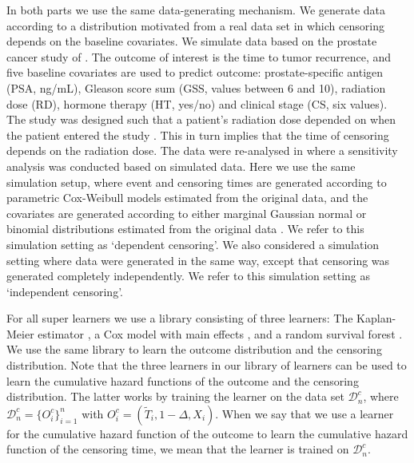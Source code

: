 \documentclass[a4paper,danish]{article}
\theoremstyle{plain} %
\numberwithin{theorem}{section}
\theoremstyle{definition} %
\theoremstyle{remark}
\newcommand{\1}{\mathds{1}}
\newcommand{\data}{\ensuremath{\mathcal{D}}}
\begin{document}
In both parts we use the same data-generating mechanism. We generate data
according to a distribution motivated from a real data set in which censoring
depends on the baseline covariates. We simulate data based on the prostate
cancer study of \cite{kattan2000pretreatment}. The outcome of interest is the
time to tumor recurrence, and five baseline covariates are used to predict
outcome: prostate-specific antigen (PSA, ng/mL), Gleason score sum (GSS, values
between 6 and 10), radiation dose (RD), hormone therapy (HT, yes/no) and
clinical stage (CS, six values). The study was designed such that a patient's
radiation dose depended on when the patient entered the study
\citep{gerds2013estimating}. This in turn implies that the time of censoring
depends on the radiation dose. The data were re-analysed in
\citep{gerds2013estimating} where a sensitivity analysis was conducted based on
simulated data. Here we use the same simulation setup, where event and censoring
times are generated according to parametric Cox-Weibull models estimated from
the original data, and the covariates are generated according to either marginal
Gaussian normal or binomial distributions estimated from the original data
\citep[c.f.,][Section~4.6]{gerds2013estimating}. We refer to this simulation
setting as `dependent censoring'. We also considered a simulation setting where
data were generated in the same way, except that censoring was generated
completely independently. We refer to this simulation setting as `independent
censoring'.

For all super learners we use a library consisting of three learners:
The Kaplan-Meier estimator
\citep{kaplan1958nonparametric,Gerds_2019prodlim}, a Cox model with
main effects \citep{cox1972regression, survival-package}, and a random
survival forest \citep{ishwaran2008random,rfsrc-paclage}. We use the
same library to learn the outcome distribution and the censoring
distribution. Note that the three learners in our library of learners
can be used to learn the cumulative hazard functions of the 
outcome and the censoring distribution. The latter works by
training the learner on the data set \( \data_n^c \), where
\( \data_n^c = \{O_i^c\}_{i=1}^n \) with
\( O_i^c = (\tilde{T}_i, 1-\Delta, X_i) \). When we say that we use a
learner for the cumulative hazard function of the outcome to learn the
cumulative hazard function of the censoring time, we mean that the
learner is trained on \( \data_n^c \).
\end{document}
